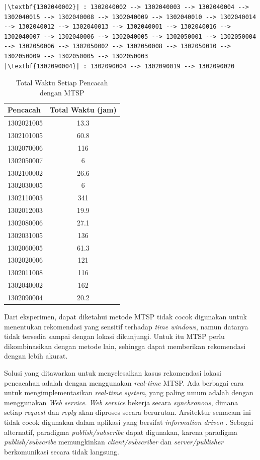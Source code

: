 \begin{listing}[!]
\begin{verbatim}
|\textbf{1302040002}| : 1302040002 --> 1302040003 --> 1302040004 --> 1302040015 --> 1302040008 --> 1302040009 --> 1302040010 --> 1302040014 --> 1302040012 --> 1302040013 --> 1302040001 --> 1302040016 --> 1302040007 --> 1302040006 --> 1302040005 --> 1302050001 --> 1302050004 --> 1302050006 --> 1302050002 --> 1302050008 --> 1302050010 --> 1302050009 --> 1302050005 --> 1302050003
|\textbf{1302090004}| : 1302090004 --> 1302090019 --> 1302090020
	\end{verbatim}
\end{listing}


\begin{table}[!]
	\centering
	\caption{Total Waktu Setiap Pencacah dengan MTSP}
	\label{tbl:enumerators_total_time}
	\begin{tabular}{lc}
		\toprule
			Pencacah & Total Waktu (jam)\\
		\midrule
			1302021005 & 13.3\\
			1302101005 & 60.8\\
			1302070006 & 116\\
			1302050007 & 6\\
			1302100002 & 26.6\\
			1302030005 & 6\\
			1302110003 & 341\\
			1302012003 & 19.9\\
			1302080006 & 27.1\\
			1302031005 & 136\\
			1302060005 & 61.3\\
			1302020006 & 121\\
			1302011008 & 116\\
			1302040002 & 162\\
			1302090004 & 20.2\\
		\bottomrule
	\end{tabular}
\end{table}


Dari eksperimen, dapat diketahui metode MTSP tidak cocok digunakan untuk menentukan rekomendasi yang sensitif terhadap \textit{time windows}, namun datanya tidak tersedia sampai dengan lokasi dikunjungi. Untuk itu MTSP perlu dikombinasikan dengan metode lain, sehingga dapat memberikan rekomendasi dengan lebih akurat.


Solusi yang ditawarkan untuk menyelesaikan kasus rekomendasi lokasi pencacahan adalah dengan menggunakan \textit{real-time} MTSP. Ada berbagai cara untuk mengimplementasikan \textit{real-time system}, yang paling umum adalah dengan menggunakan \textit{Web service}. \textit{Web service} bekerja secara \textit{synchronous}, dimana setiap \textit{request} dan \textit{reply} akan diproses secara berurutan. Arsitektur semacam ini tidak cocok digunakan dalam aplikasi yang bersifat \textit{information driven} \citep{muhl_large-scale_2002}. Sebagai alternatif, paradigma \textit{publish/subscribe} dapat digunakan, karena paradigma \textit{publish/subscribe} memungkinkan \textit{client/subscriber} dan \textit{server/publisher} berkomunikasi secara tidak langsung.


